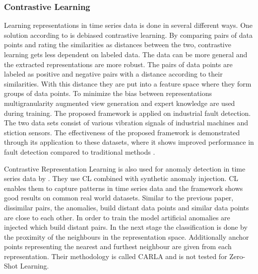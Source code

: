 \subsubsection{Contrastive Learning}
Learning representations in time series data is done in several different ways. One solution according to  is debiased contrastive learning. By comparing pairs of data points and rating the similarities as distances between the two, contrastive learning gets less dependent on labeled data. The data can be more general and the extracted representations are more robust. The pairs of data points are labeled as positive and negative pairs with a distance according to their similarities. With this distance they are put into a feature space where they form groups of data points. To minimize the bias between representations multigranularity augmented view generation and expert knowledge are used during training. The proposed framework is applied on industrial fault detection. The two data sets consist of various vibration signals of industrial machines and stiction sensors. The effectiveness of the proposed framework is demonstrated through its application to these datasets, where it shows improved performance in fault detection compared to traditional methods .

Contrastive Representation Learning is also used for anomaly detection in time series data by . They use CL combined with synthetic anomaly injection. CL enables them to capture patterns in time series data and the framework shows good results on common real world datasets. Similar to the previous paper, dissimilar pairs, the anomalies, build distant data points and similar data points are close to each other. In order to train the model artificial anomalies are injected which build distant pairs. In the next stage the classification is done by  the proximity of the neighbours in the representation space. Additionally anchor points representing the nearest and furthest neighbour are given from each representation. Their methodology is called CARLA and is not tested for Zero-Shot Learning.%

